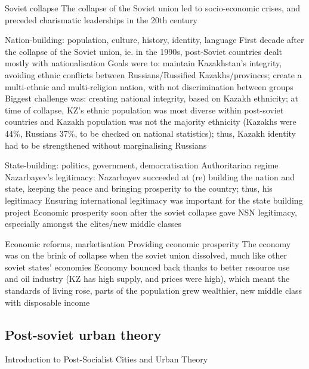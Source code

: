 \documentclass{article}
\begin{document}
\begin{outline}
	\1 Soviet collapse
		\2 The collapse of the Soviet union led to socio-economic crises, and preceded charismatic leaderships in the 20th century\cite{isaacs2010papa}
		
	\1 Nation-building: population, culture, history, identity, language
		\2 First decade after the collapse of the Soviet union, ie. in the 1990s, post-Soviet countries dealt mostly with nationalisation
		\2 Goals were to: maintain Kazakhstan's integrity, avoiding ethnic conflicts between Russians/Russified Kazakhs/provinces; create a multi-ethnic and multi-religion nation, with not discrimination between groups
		\2 Biggest challenge was: creating national integrity, based on Kazakh ethnicity; at time of collapse, KZ's ethnic population was most diverse within post-soviet countries and Kazakh population was not the majority ethnicity (Kazakhs were 44\%, Russians 37\%, to be checked on national statistics); thus, Kazakh identity had to be strengthened without marginalising Russians 

	\1 State-building: politics, government, democratisation
		\2	Authoritarian regime
		\2 Nazarbayev's legitimacy:
			\3 Nazarbayev succeeded at (re) building the nation and state, keeping the peace and bringing prosperity to the country; thus, his legitimacy 
			\3 Ensuring international legitimacy was important for the state building project
			\3 Economic prosperity soon after the soviet collapse gave NSN legitimacy, especially amongst the elites/new middle classes
			
	\1 Economic reforms, marketisation
		\2 Providing economic prosperity
		\2 The economy was on the brink of collapse when the soviet union dissolved, much like other soviet states' economies
		\2 Economy bounced back thanks to better resource use and oil industry (KZ has high supply, and prices were high), which meant the standards of living rose, parts of the population grew wealthier, new middle class with disposable income
\end{outline}

\subsection{Post-soviet urban theory}

Introduction to Post-Socialist Cities and Urban Theory\cite{ferenvcuhova2016introduction}
\end{document}
